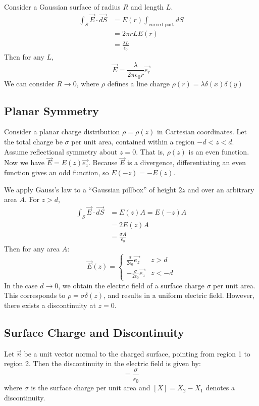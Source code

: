 \documentclass[../Main.tex]{subfiles}
\begin{document}
Consider a Gaussian surface of radius $R$ and length $L$.
\begin{align*}
    \int_S \vec{E} \cdot \vec{dS} &= E(r) \int_{\text{curved part}} dS \\
    &= 2\pi r L E(r) \\
    &= \frac{\lambda L}{\epsilon_0}
\end{align*}
Then for any $L$, 
\begin{equation*}
    \vec{E} = \frac{\lambda}{2\pi \epsilon_0 r} \vec{e_r}
\end{equation*}
We can consider $R \to 0$, where $\rho$ defines a line charge $\rho(r) = \lambda \delta(x)\delta(y)$
\subsection{Planar Symmetry}
Consider a planar charge distribution $\rho = \rho(z)$ in Cartesian coordinates. Let the total charge be $\sigma$ per unit area, contained within a region $-d<z<d$. Assume reflectional symmetry about $z = 0$. That is, $\rho(z)$ is an even function. Now we have $\vec{E} = E(z) \vec{e_z}$. Because $\vec{E}$ is a divergence, differentiating an even function gives an odd function, so $E(-z) = -E(z)$.

We apply Gauss's law to a ``Gaussian pillbox'' of height $2z$ and over an arbitrary area $A$. For $z > d$,
\begin{align*}
    \int_S \vec{E} \cdot \vec{dS} &= E(z) A = E(-z) A \\
    &= 2E(z) A \\
    &= \frac{\sigma A}{\epsilon_0}
\end{align*}
Then for any area $A$:
\begin{equation*}
    \vec{E}(z) =
    \begin{cases}
        \frac{\sigma}{2\epsilon_0} \vec{e_z} & z > d \\
        -\frac{\sigma}{2\epsilon_0} \vec{e_z} & z < -d
    \end{cases}
\end{equation*}
In the case $d \to 0$, we obtain the electric field of a surface charge $\sigma$ per unit area. This corresponds to $\rho = \sigma \delta(z)$, and results in a uniform electric field. However, there exists a discontinuity at $z = 0$.
\subsection{Surface Charge and Discontinuity}
Let $\vec{n}$ be a unit vector normal to the charged surface, pointing from region 1 to region 2. Then the discontinuity in the electric field is given by:
\begin{equation}
    [\vec{n} \cdot \vec{E}] = \frac{\sigma}{\epsilon_0}
    \label{eqnSurfaceChargeDcty}
\end{equation}
where $\sigma$ is the surface charge per unit area and $[X] = X_2 - X_1$ denotes a discontinuity.
\end{document}
